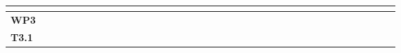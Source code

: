 \begin{table}[h]
{\begin{tabular}{|l|llllllllllll|llllllllllll|llllllllllll|}
  \multicolumn{1}{l|}{} &
  \multicolumn{1}{l|}{} &
  \multicolumn{1}{l|}{} &
  \multicolumn{1}{l|}{} &
  \multicolumn{1}{l|}{} &
  \multicolumn{1}{l|}{} &
  \multicolumn{1}{l|}{} &
  \multicolumn{1}{l|}{\cellcolor[HTML]{FBD4B4}} &
  \multicolumn{1}{l|}{\cellcolor[HTML]{FBD4B4}} &
  \multicolumn{1}{l|}{\cellcolor[HTML]{FBD4B4}} &
  \multicolumn{1}{l|}{\cellcolor[HTML]{FBD4B4}} &
  \multicolumn{1}{l|}{\cellcolor[HTML]{FBD4B4}} &
  \multicolumn{1}{l|}{\cellcolor[HTML]{FBD4B4}} &
  \multicolumn{1}{l|}{\cellcolor[HTML]{FBD4B4}} &
  \multicolumn{1}{l|}{\cellcolor[HTML]{FBD4B4}} &
  \multicolumn{1}{l|}{\cellcolor[HTML]{FBD4B4}} &
  \multicolumn{1}{l|}{\cellcolor[HTML]{FBD4B4}} &
  \multicolumn{1}{l|}{\cellcolor[HTML]{FBD4B4}} &
  \multicolumn{1}{l|}{\cellcolor[HTML]{FBD4B4}} 
   \\ \hline
\textbf{WP3} &
  \multicolumn{1}{l|}{} &
  \multicolumn{1}{l|}{} &
  \multicolumn{1}{l|}{} &
  \multicolumn{1}{l|}{} &
  \multicolumn{1}{l|}{} &
  \multicolumn{1}{l|}{} &
  \multicolumn{1}{l|}{} &
  \multicolumn{1}{l|}{} &
  \multicolumn{1}{l|}{} &
  \multicolumn{1}{l|}{} &
  \multicolumn{1}{l|}{} &
  \multicolumn{1}{l|}{} &
  \multicolumn{1}{l|}{} &
  \multicolumn{1}{l|}{} &
  \multicolumn{1}{l|}{} &
  \multicolumn{1}{l|}{} &
  \multicolumn{1}{l|}{} &
  \multicolumn{1}{l|}{} &
  \multicolumn{1}{l|}{} &
  \multicolumn{1}{l|}{} &
  \multicolumn{1}{l|}{} &
  \multicolumn{1}{l|}{} &
  \multicolumn{1}{l|}{} &
  \multicolumn{1}{l|}{} &
  \multicolumn{1}{l|}{\cellcolor[HTML]{DDD9C3}} &
  \multicolumn{1}{l|}{\cellcolor[HTML]{DDD9C3}} &
  \multicolumn{1}{l|}{\cellcolor[HTML]{DDD9C3}} &
  \multicolumn{1}{l|}{\cellcolor[HTML]{DDD9C3}} &
  \multicolumn{1}{l|}{\cellcolor[HTML]{DDD9C3}} &
  \multicolumn{1}{l|}{\cellcolor[HTML]{DDD9C3}} &
  \multicolumn{1}{l|}{\cellcolor[HTML]{DDD9C3}} &
  \multicolumn{1}{l|}{\cellcolor[HTML]{DDD9C3}} &
  \multicolumn{1}{l|}{\cellcolor[HTML]{DDD9C3}} &
  \multicolumn{1}{l|}{\cellcolor[HTML]{DDD9C3}} &
  \multicolumn{1}{l|}{\cellcolor[HTML]{DDD9C3}} &
  \multicolumn{1}{l|}{\cellcolor[HTML]{DDD9C3}} 
  \\ \hline
\textbf{T3.1} &
  \multicolumn{1}{l|}{} &
  \multicolumn{1}{l|}{} &
  \multicolumn{1}{l|}{} &
  \multicolumn{1}{l|}{} &
  \multicolumn{1}{l|}{} &
  \multicolumn{1}{l|}{} &
  \multicolumn{1}{l|}{} &
  \multicolumn{1}{l|}{} &
  \multicolumn{1}{l|}{} &
  \multicolumn{1}{l|}{} &
  \multicolumn{1}{l|}{} &
  \multicolumn{1}{l|}{} &
  \multicolumn{1}{l|}{} &
  \multicolumn{1}{l|}{} &
  \multicolumn{1}{l|}{} &
  \multicolumn{1}{l|}{} &
  \multicolumn{1}{l|}{} &

\end{tabular}}
\end{table}
